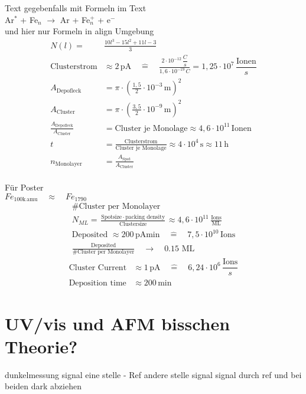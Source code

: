 Text gegebenfalls mit Formeln im Text \\
Ar$^*$ + Fe$_n$ $\rightarrow $ Ar + Fe$^+_{n}$ + e$^-$ \\
und hier nur Formeln in align Umgebung\\
\begin{align}
  N(l)=&\frac{10l^3 -15l^2 + 11l -3}{3} \\
  \text{Clusterstrom}&\approx 2\,\text{pA} \quad \widehat{=} \quad \frac{2\cdot10^{-12}\,\dfrac{C}{s}}{1,6\cdot10^{-19}\,C} = 1,25\cdot10^7 \,\dfrac{\text{Ionen}}{s} \\
  A_{\text{Depofleck}}&=\pi\cdot(\frac{1,5}{2}\cdot10^{-3}\,\text{m})^2 \\
  A_{\text{Cluster}}&=\pi\cdot(\frac{3,5}{2}\cdot10^{-9}\,\text{m})^2 \\
  \frac{A_{\text{Depofleck}}}{A_{\text{Cluster}}}&= \text{Cluster je Monolage}\approx 4,6\cdot10^{11} \,\text{Ionen}\\
  t&=\frac{\text{Clusterstrom}}{\text{Cluster je Monolage}}\approx 4\cdot10^4\,\text{s} \approx 11\,\text{h} \\
  n_{\text{Monolayer}}&=\frac{A_{\text{Spot}}}{A_{\text{Cluster}}}
\end{align}
\blindtext \\
Für Poster \\
$Fe_{100\text{k}\,\text{amu}} \quad\approx\quad Fe_{1790} $
\begin{align*}
 \text{\#Cluster per Monolayer}\\
 N_{ML}=\frac{\text{Spotsize$\,\cdot\,$packing density}}{\text{Clustersize}} \approx  4,6\cdot10^{11}\,\frac{\text{Ions}}{\text{ML}} \\
 \text{Deposited $\approx 200\,$pAmin}\quad \widehat{=} \quad  7,5\cdot10^{10} \,\text{Ions} \\
 \frac{\text{Deposited}}{\text{\#Cluster per Monolayer}}\quad \rightarrow \quad 0.15\,\,\text{ML}
\end{align*}
\begin{align}
 \text{Cluster Current}&\approx 1\,\text{pA} \quad \widehat{=} \quad 6,24\cdot10^6 \,\dfrac{\text{Ions}}{s} \\
 \text{Deposition time}&\approx 200\,\text{min} 
\end{align}

\section{UV/vis und AFM bisschen Theorie?}
dunkelmessung
signal eine stelle - Ref
andere stelle signal
signal durch ref und bei beiden dark abziehen


